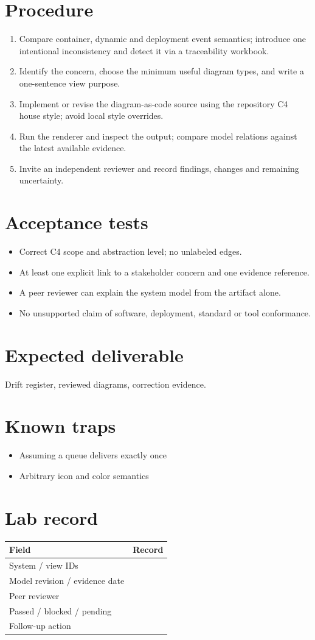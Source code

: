 \documentclass[10pt,letterpaper]{article}
\begin{document}
\section{Procedure}
\begin{enumerate}
\item Compare container, dynamic and deployment event semantics; introduce one intentional inconsistency and detect it via a traceability workbook.
\item Identify the concern, choose the minimum useful diagram types, and write a one-sentence view purpose.
\item Implement or revise the diagram-as-code source using the repository C4 house style; avoid local style overrides.
\item Run the renderer and inspect the output; compare model relations against the latest available evidence.
\item Invite an independent reviewer and record findings, changes and remaining uncertainty.
\end{enumerate}

\section{Acceptance tests}
\begin{itemize}
\item Correct C4 scope and abstraction level; no unlabeled edges.
\item At least one explicit link to a stakeholder concern and one evidence reference.
\item A peer reviewer can explain the system model from the artifact alone.
\item No unsupported claim of software, deployment, standard or tool conformance.
\end{itemize}

\section{Expected deliverable}
Drift register, reviewed diagrams, correction evidence.


\section{Known traps}
\begin{itemize}
\item Assuming a queue delivers exactly once
\item Arbitrary icon and color semantics
\end{itemize}

\section{Lab record}
\begin{tabularx}{\linewidth}{@{}YY@{}}\toprule
\textbf{Field} & \textbf{Record} \\ \midrule
System / view IDs &  \\
Model revision / evidence date &  \\
Peer reviewer &  \\
Passed / blocked / pending &  \\
Follow-up action &  \\
\bottomrule\end{tabularx}
\end{document}
